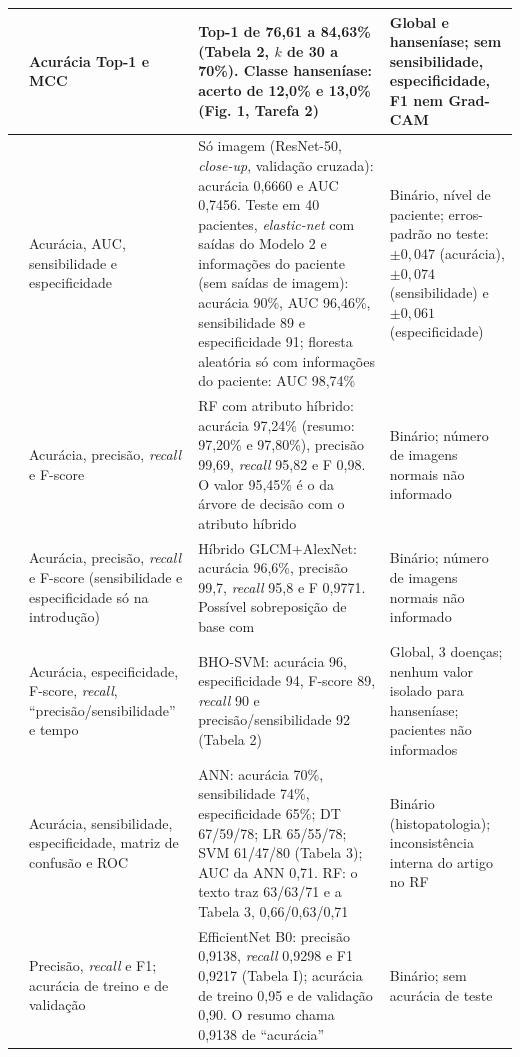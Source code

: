 \begin{longtable}{|>{\raggedright\arraybackslash}p{1.3cm}|>{\raggedright\arraybackslash}p{3.3cm}|>{\raggedright\arraybackslash}p{6.6cm}|>{\raggedright\arraybackslash}p{3.8cm}|}
	\endlastfoot
	\estudo{E05} & Acurácia Top-1 e MCC & Top-1 de 76,61 a 84,63\% (Tabela 2, $k$ de 30 a 70\%). Classe hanseníase: acerto de 12,0\% e 13,0\% (Fig. 1, Tarefa 2) & Global e hanseníase; sem sensibilidade, especificidade, F1 nem Grad-CAM \\ \hline
	\estudo{E13} & Acurácia, AUC, sensibilidade e especificidade & Só imagem (ResNet-50, \textit{close-up}, validação cruzada): acurácia 0,6660 e AUC 0,7456. Teste em 40 pacientes, \textit{elastic-net} com saídas do Modelo 2 e informações do paciente (sem saídas de imagem): acurácia 90\%, AUC 96,46\%, sensibilidade 89 e especificidade 91; floresta aleatória só com informações do paciente: AUC 98,74\% & Binário, nível de paciente; erros-padrão no teste: $\pm 0,047$ (acurácia), $\pm 0,074$ (sensibilidade) e $\pm 0,061$ (especificidade) \\ \hline
	\estudo{E06} & Acurácia, precisão, \textit{recall} e F-score & RF com atributo híbrido: acurácia 97,24\% (resumo: 97,20\% e 97,80\%), precisão 99,69, \textit{recall} 95,82 e F 0,98. O valor 95,45\% é o da árvore de decisão com o atributo híbrido & Binário; número de imagens normais não informado \\ \hline
	\estudo{E18} & Acurácia, precisão, \textit{recall} e F-score (sensibilidade e especificidade só na introdução) & Híbrido GLCM+AlexNet: acurácia 96,6\%, precisão 99,7, \textit{recall} 95,8 e F 0,9771. Possível sobreposição de base com \estudo{E06} & Binário; número de imagens normais não informado \\ \hline
	\estudo{E07} & Acurácia, especificidade, F-score, \textit{recall}, ``precisão/sensibilidade'' e tempo & BHO-SVM: acurácia 96, especificidade 94, F-score 89, \textit{recall} 90 e precisão/sensibilidade 92 (Tabela 2) & Global, 3 doenças; nenhum valor isolado para hanseníase; pacientes não informados \\ \hline
	\estudo{E08} & Acurácia, sensibilidade, especificidade, matriz de confusão e ROC & ANN: acurácia 70\%, sensibilidade 74\%, especificidade 65\%; DT 67/59/78; LR 65/55/78; SVM 61/47/80 (Tabela 3); AUC da ANN 0,71. RF: o texto traz 63/63/71 e a Tabela 3, 0,66/0,63/0,71 & Binário (histopatologia); inconsistência interna do artigo no RF \\ \hline
	\estudo{E19} & Precisão, \textit{recall} e F1; acurácia de treino e de validação & EfficientNet B0: precisão 0,9138, \textit{recall} 0,9298 e F1 0,9217 (Tabela I); acurácia de treino 0,95 e de validação 0,90. O resumo chama 0,9138 de ``acurácia'' & Binário; sem acurácia de teste \\ \hline

\end{longtable}

